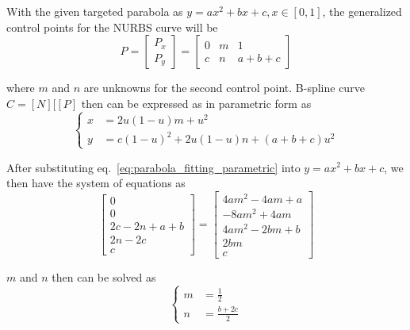 With the given targeted parabola as $y=ax^2+bx+c,x \in [0,1]$, the generalized control points for the NURBS curve will be
    \begin{equation}
        P= \begin{bmatrix}
            P_x \\
            P_y
        \end{bmatrix} = \begin{bmatrix}
            0 & m & 1 \\
            c & n & a+b+c
        \end{bmatrix}
    \end{equation}

where $m$ and $n$ are unknowns for the second control point.
B-spline curve $C=[N][[P]$ then can be expressed as in parametric form as
    \begin{equation}
        \left\{
        \begin{aligned}
            x &= 2u(1-u)m + u^2 \\
            y &= c(1-u)^2 + 2u(1-u)n + (a+b+c)u^2
        \end{aligned}
        \right.
    \label{eq:parabola_fitting_parametric}
    \end{equation}

After substituting eq.~\ref{eq:parabola_fitting_parametric} into $y=ax^2+bx+c$, we then have the system of equations as
    \begin{equation}
        \begin{bmatrix}
            0 \\
            0 \\
            2c - 2n +a +b \\
            2n - 2c \\
            c
        \end{bmatrix} = 
        \begin{bmatrix}
            4am^2-4am+a \\
            -8am^2 + 4am \\
            4am^2 -2bm +b \\
            2bm \\
            c
        \end{bmatrix}
    \end{equation}

$m$ and $n$ then can be solved as
    \begin{equation}
        \left\{
        \begin{aligned}
            m &= \frac{1}{2} \\
            n &= \frac{b+2c}{2}
        \end{aligned}
        \right.
    \end{equation}

